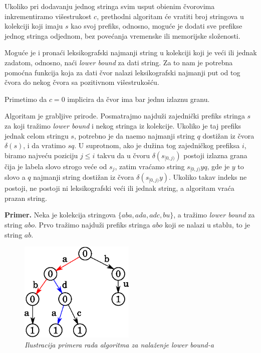 Ukoliko pri dodavanju jednog stringa svim usput obi\dj enim \v cvorovima inkrementiramo vi\v sestrukost $c$, prethodni algoritam \' ce vratiti broj stringova u kolekciji koji imaju $s$ kao svoj prefiks, odnosno, mogu\' ce je dodati sve prefikse jednog stringa odjednom, bez pove\' canja vremenske ili memorijske slo\v zenosti.

Mogu\' ce je i prona\' ci leksikografski najmanji string u kolekciji koji je ve\' ci ili jednak zadatom, odnosno, na\' ci \textit{lower bound} za dati string. Za to nam je potrebna pomo\' cna funkcija koja za dati \v cvor nalazi leksikografski najmanji put od tog \v cvora do nekog \v cvora sa pozitivnom vi\v sestruko\v s\' cu. 



Primetimo da $c=0$ implicira da \v cvor ima bar jednu izlaznu granu.

\noindent
\begin{minipage}[l]{\textwidth}

\end{minipage}

Algoritam je grabljive prirode. Posmatrajmo najdu\v zi zajedni\v cki prefiks stringa $s$ za koji tra\v zimo \textit{lower bound} i nekog stringa iz kolekcije. Ukoliko je taj prefiks jednak celom stringu $s$, potrebno je da na\dj emo najmanji string $q$ dosti\v zan iz \v cvora $\delta(s)$, i da vratimo $sq$. U suprotnom, ako je du\v zina tog zajedni\v ckog prefiksa $i$, biramo najve\' cu poziciju $j \leq i$ takvu da u \v cvoru $\delta(s_{[0, j)})$ postoji izlazna grana \v cija je labela slovo strogo ve\' ce od $s_j$, zatim vra\' camo string $s_{[0,j)}yq$, gde je $y$ to slovo a $q$ najmanji string dosti\v zan iz \v cvora $\delta(s_{[0,j)}y)$. Ukoliko takav indeks ne postoji, ne postoji ni leksikografski ve\' ci ili jednak string, a algoritam vra\' ca prazan string.

\noindent \textbf{Primer.} Neka je kolekcija stringova $\{aba, ada, adc, bu\}$, a tra\v zimo \textit{lower bound} za string $abo$. Prvo tra\v zimo najdu\v zi prefiks stringa $abo$ koji se nalazi u stablu, to je string $ab$.

\begin{figure}[H]
    \centering
    \includegraphics[width=55mm]{../img/trielb1.eps}
    \caption*{\textit{Ilustracija primera rada algoritma za nala\v zenje lower bound-a}}
\end{figure}

